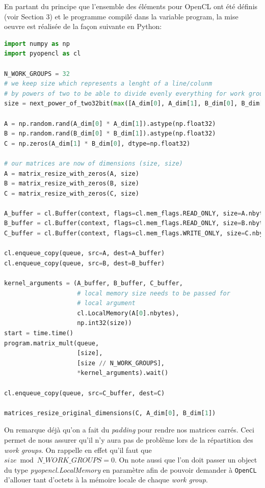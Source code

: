 En partant du principe que l’ensemble des éléments pour OpenCL ont été définis (voir Section 3)
et le programme compilé dans la variable program, la mise oeuvre est réalisée de la façon suivante en
Python:
\begin{lstlisting}[language=python]
import numpy as np
import pyopencl as cl

N_WORK_GROUPS = 32
# we keep size which represents a lenght of a line/colunm 
# by powers of two to be able to divide evenly everything for work groups
size = next_power_of_two32bit(max([A_dim[0], A_dim[1], B_dim[0], B_dim[1]]))    

A = np.random.rand(A_dim[0] * A_dim[1]).astype(np.float32)   
B = np.random.rand(B_dim[0] * B_dim[1]).astype(np.float32)   
C = np.zeros(A_dim[1] * B_dim[0], dtype=np.float32)

# our matrices are now of dimensions (size, size)
A = matrix_resize_with_zeros(A, size)
B = matrix_resize_with_zeros(B, size)
C = matrix_resize_with_zeros(C, size)

A_buffer = cl.Buffer(context, flags=cl.mem_flags.READ_ONLY, size=A.nbytes)
B_buffer = cl.Buffer(context, flags=cl.mem_flags.READ_ONLY, size=B.nbytes)
C_buffer = cl.Buffer(context, flags=cl.mem_flags.WRITE_ONLY, size=C.nbytes)

cl.enqueue_copy(queue, src=A, dest=A_buffer)
cl.enqueue_copy(queue, src=B, dest=B_buffer)

kernel_arguments = (A_buffer, B_buffer, C_buffer,
                    # local memory size needs to be passed for
                    # local argument
                    cl.LocalMemory(A[0].nbytes),
                    np.int32(size))
start = time.time()
program.matrix_mult(queue,
                    [size],
                    [size // N_WORK_GROUPS],
                    *kernel_arguments).wait()

cl.enqueue_copy(queue, src=C_buffer, dest=C)

matrices_resize_original_dimensions(C, A_dim[0], B_dim[1])
\end{lstlisting}
\vspace{20pt}

On remarque déjà qu'on a fait du \textit{padding} pour rendre nos matrices 
carrés. Ceci permet de nous assurer qu'il n'y aura pas de problème lors de 
la répartition des \textit{work groups}. On rappelle en effet qu'il faut que
$size \bmod N\_WORK\_GROUPS = 0$. On note aussi que l'on doit passer 
un object du type \textit{pyopencl.LocalMemory} en paramètre afin de pouvoir 
demander à \texttt{OpenCL} d'allouer tant d'octets à la mémoire locale de chaque
\textit{work group}.

